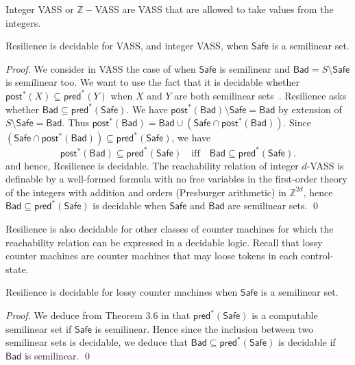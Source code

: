 \documentclass[runningheads]{llncs}
\newcommand{\pred}{\textsf{pred}}
\newcommand{\post}{\textsf{post}}
\newcommand{\Bad}{\textsf{Bad}}
\newcommand{\Safe}{\textsf{Safe}}
\begin{document}
Integer VASS or $\mathbb{Z}-$VASS \cite{DBLP:conf/rp/HaaseH14} are VASS that are allowed to take values from the integers.

\begin{theorem}\label{SL VASS}
{\sc Resilience} is decidable for VASS, and integer VASS, when $\Safe$  is a semilinear set.
\end{theorem}

\begin{proof}
We consider in VASS the case of when $\Safe$ is semilinear
and $\Bad = S \setminus \Safe$ is semilinear too.
We want to use the fact that
it is decidable whether $\post^*(X) \subseteq \pred^*(Y)$ when 
$X$ and $Y$ are both semilinear sets~\cite{DBLP:journals/corr/abs-2207-02697}.
{\sc Resilience} asks whether $\Bad \subseteq \pred^*(\Safe)$.
We have $\post^*(\Bad) \setminus \Safe = \Bad$ by extension of $S \setminus \Safe = \Bad$.
Thus $\post^*(\Bad) = \Bad \cup (\Safe \cap \post^*(\Bad))$. Since $(\Safe \cap \post^*(\Bad)) \subseteq \pred^*(\Safe)$, we have
\[\post^*(\Bad) \subseteq \pred^*(\Safe) \quad \text{iff} \quad \Bad \subseteq \pred^*(\Safe).\]
and hence, {\sc Resilience} is decidable. 
The reachability relation of integer $d$-VASS is definable by a well-formed formula with no free variables in the first-order theory of the integers with addition and orders (Presburger arithmetic) in $\mathbb{Z}^{2d}$, hence	$\Bad \subseteq \pred^*(\Safe)$ is decidable when $\Safe$ and $\Bad$ are semilinear sets. \qed
\end{proof}

{\sc Resilience} is also decidable for other classes of counter machines for which the reachability relation can be expressed in a decidable logic. Recall that lossy counter machines \cite{DBLP:conf/rp/Schnoebelen10} are counter machines that may loose tokens in each control-state.

\begin{theorem}\label{SL Lossy}
{\sc Resilience} is decidable for lossy counter machines when $\Safe$  is a semilinear set.
\end{theorem}

\begin{proof}
We deduce from Theorem 3.6 in \cite{DBLP:conf/rp/Schnoebelen10} that $\pred^*(\Safe)$ is a computable semilinear set if $\Safe$ is semilinear. Hence since the inclusion between two semilinear sets is decidable, we deduce that $\Bad \subseteq \pred^*(\Safe)$ is decidable if $\Bad$ is semilinear. \qed
\end{proof}
\end{document}
